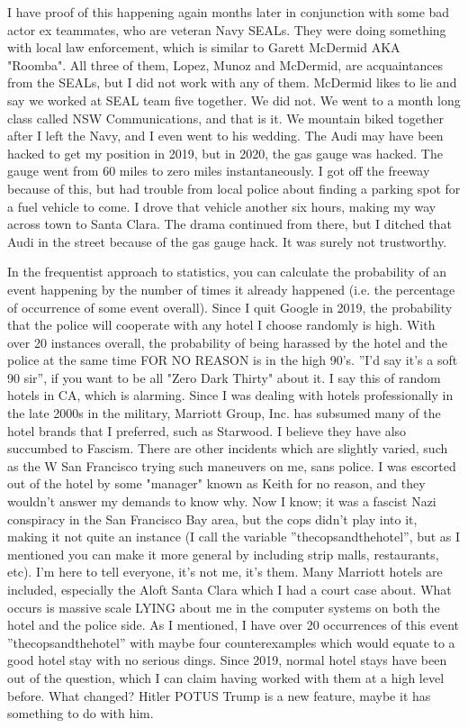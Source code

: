 \documentclass[a4paper]{arthur-letter}
\begin{document}
\begin{letter}
    I have proof of this happening again months later in conjunction with some bad actor ex teammates, who are veteran Navy SEALs. They were doing something with local law enforcement, which is similar to Garett McDermid AKA "Roomba". All three of them, Lopez, Munoz and McDermid, are acquaintances from the SEALs, but I did not work with any of them. McDermid likes to lie and say we worked at SEAL team five together. We did not. We went to a month long class called NSW Communications, and that is it. We mountain biked together after I left the Navy, and I even went to his wedding. The Audi may have been hacked to get my position in 2019, but in 2020, the gas gauge was hacked. The gauge went from 60 miles to zero miles instantaneously. I got off the freeway because of this, but had trouble from local police about finding a parking spot for a fuel vehicle to come. I drove that vehicle another six hours, making my way across town to Santa Clara. The drama continued from there, but I ditched that Audi in the street because of the gas gauge hack. It was surely not trustworthy. 
    
    In the frequentist approach to statistics, you can calculate the probability of an event happening by the number of times it already happened (i.e. the percentage of occurrence of some event overall). Since I quit Google in 2019, the probability that the police will cooperate with any hotel I choose randomly is high. With over 20 instances overall, the probability of being harassed by the hotel and the police at the same time FOR NO REASON is in the high 90's. ''I'd say it's a soft 90 sir'', if you want to be all "Zero Dark Thirty" about it. I say this of random hotels in CA, which is alarming. Since I was dealing with hotels professionally in the late 2000s in the military, Marriott Group, Inc. has subsumed many of the hotel brands that I preferred, such as Starwood. I believe they have also succumbed to Fascism. There are other incidents which are slightly varied, such as the W San Francisco trying such maneuvers on me, sans police. I was escorted out of the hotel by some "manager" known as Keith for no reason, and they wouldn't answer my demands to know why. Now I know; it was a fascist Nazi conspiracy in the San Francisco Bay area, but the cops didn't play into it, making it not quite an instance (I call the variable ''thecopsandthehotel'', but as I mentioned you can make it more general by including strip malls, restaurants, etc). I'm here to tell everyone, it's not me, it's them. Many Marriott hotels are included, especially the Aloft Santa Clara which I had a court case about. What occurs is massive scale LYING about me in the computer systems on both the hotel and the police side. As I mentioned, I have over 20 occurrences of this event ''thecopsandthehotel'' with maybe four counterexamples which would equate to a good hotel stay with no serious dings. Since 2019, normal hotel stays have been out of the question, which I can claim having worked with them at a high level before. What changed? Hitler POTUS Trump is a new feature, maybe it has something to do with him.
    

\end{letter}
\end{document}
